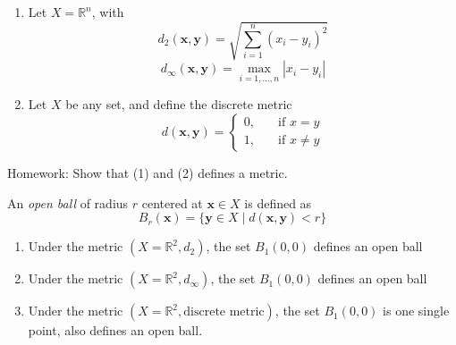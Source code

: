 \begin{example}
\begin{enumerate}
\item
Let $X=\mathbb{R}^n$, with 
\[
d_2(\bm x,\bm y)=\sqrt{\sum_{i=1}^n(x_i-y_i)^2}
\]
\[
d_\infty(\bm x,\bm y)=\max_{i=1,\dots,n}|x_i-y_i|
\]
\item
Let $X$ be any set, and define the discrete metric 
\[
d(\bm x,\bm y)=\left\{
\begin{aligned}
0,&\quad\mbox{if }x=y\\
1,&\quad\mbox{if }x\ne y
\end{aligned}
\right.
\]
\end{enumerate}
Homework: Show that (1) and (2) defines a metric.
\end{example}
\begin{definition}
An \emph{open ball} of radius $r$ centered at $\bm x\in X$ is defined as
\[
B_r(\bm x)=\{\bm y\in X\mid d(\bm x,\bm y)<r\}
\]
\end{definition}
\begin{example}
\begin{enumerate}
\item
Under the metric $(X=\mathbb{R}^2,d_2)$, the set $B_1(0,0)$ defines an open ball

\item
Under the metric $(X=\mathbb{R}^2,d_\infty)$, the set $B_1(0,0)$ defines an open ball

\item
Under the metric $(X=\mathbb{R}^2,\text{discrete metric})$, the set $B_1(0,0)$ is one single point, also defines an open ball.

\end{enumerate}
\end{example}

